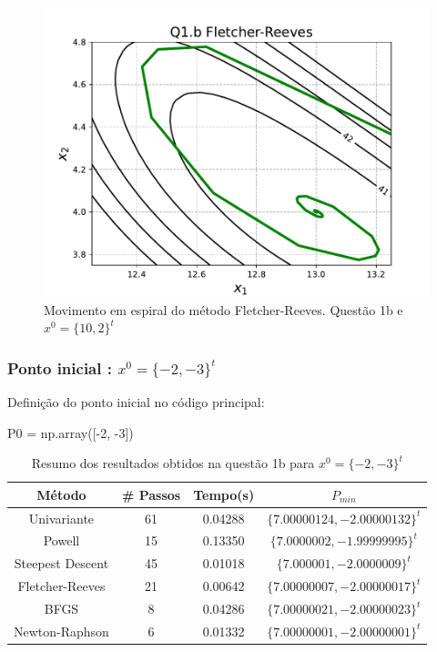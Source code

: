 \documentclass[10pt, a4paper]{article}
\begin{document}
\begin{figure}[H]
  \centering
  \includegraphics[scale=0.5]{figuras/Q1.b_espiral_Fletcher-Reeves_P0=[10e2].pdf}
  \caption{Movimento em espiral do método Fletcher-Reeves. Questão 1b e $x^0 = \{10,2\}^t$ }
\end{figure}

\subsubsection{Ponto inicial : $x^0 = \{-2,-3\}^t $}

Definição do ponto inicial no código principal:
\begin{python}
  P0 = np.array([-2, -3])
\end{python}

\begin{table}[H]
  \begin{center}
    \begin{tabular}{c|c|c|c}
      \textbf{Método} & \textbf{\# Passos} & \textbf{Tempo(s)} & \textbf{$P_{min}$}\\
      \hline
      Univariante       & 61  & 0.04288 & $\{7.00000124, -2.00000132\}^t$\\
      Powell            & 15  & 0.13350 & $\{7.0000002, -1.99999995\}^t$\\
      Steepest Descent  & 45  & 0.01018 & $\{7.000001, -2.0000009\}^t$\\
      Fletcher-Reeves   & 21  & 0.00642 & $\{7.00000007, -2.00000017\}^t$\\
      BFGS              & 8   & 0.04286 & $\{7.00000021, -2.00000023\}^t$\\
      Newton-Raphson    & 6   & 0.01332 & $\{7.00000001, -2.00000001\}^t$\\
    \end{tabular}
  \end{center}
  \caption{Resumo dos resultados obtidos na questão 1b para $x^0 = \{-2,-3\}^t$}
\end{table}
\end{document}
